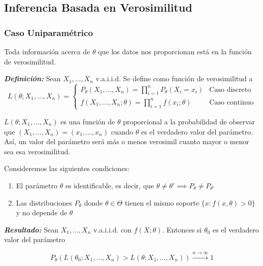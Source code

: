 \subsection{Inferencia Basada en Verosimilitud}

\subsubsection{Caso Uniparamétrico}

Toda información acerca de $\theta$ que los datos nos proporcionan está en la función de verosimilitud.

\newpage

\textbf{\textit{Definición: }} Sean $X_1, \dots, X_n$ v.a.i.i.d. Se define como función de verosimilitud a
\[
    L(\theta; X_1,\dots,X_n) =
    \begin{cases}
        P_\theta(X_1,\dots,X_n)=\prod_{i=1}^{n}P_\theta(X_i=x_i) & \text{Caso discreto} \\
        f(X_1,\dots,X_n; \theta)=\prod_{i=1}^{n}f(x_i; \theta)   & \text{Caso continuo}
    \end{cases}
\]

$L(\theta; X_1,\dots,X_n)$ es una función de $\theta$ proporcional a la probabilidad de observar que $(X_1,\dots,X_n)=(x_1,\dots,x_n)$ cuando $\theta$ es el verdadero valor del parámetro. Así, un valor del parámetro será más o menos verosimil cuanto mayor o menor sea esa verosimilitud.

Consideremos las siguientes condiciones:

\begin{enumerate}
    \item El parámetro $\theta$ es identificable, es decir, que $\theta \neq \theta' \implies P_\theta \neq P_{\theta'}$
    \item Las distribuciones $P_\theta$ donde $\theta \in \Theta$ tienen el mismo soporte $\{x:f(x,\theta) > 0\}$ y no depende de $\theta$
\end{enumerate}

\textbf{\textit{Resultado: }} Sean $X_1,\dots,X_n$ v.a.i.i.d. con $f(X;\theta)$. Entonces si $\theta_0$ es el verdadero valor del parámetro

\[
    P_\theta(L(\theta_0;X_1,\dots,X_n)>L(\theta;X_1,\dots,X_n))\xrightarrow{n\to\infty}1
\]

